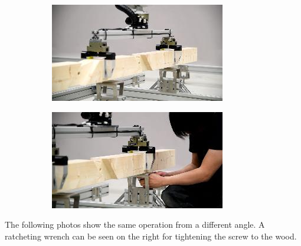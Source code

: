 \documentclass[11pt]{book}
\begin{document}
\begin{figure}[H]
\centering
\begin{subfigure}[b]{0.45\textwidth}
\centering
\includegraphics[width=\textwidth]{./images/image78.jpeg}
\end{subfigure}
\hfill
\begin{subfigure}[b]{0.45\textwidth}
\centering
\includegraphics[width=\textwidth]{./images/image79.jpeg}
\end{subfigure}
\end{figure}


The following photos show the same operation from a different angle. A ratcheting wrench can be seen on the right for tightening the screw to the wood.
\end{document}
